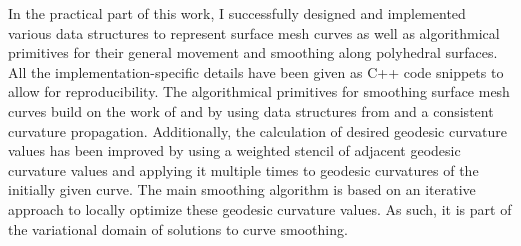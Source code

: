 \documentclass[crop=false]{stdlocal}
\begin{document}
  In the practical part of this work, I successfully designed and implemented various data structures to represent surface mesh curves as well as algorithmical primitives for their general movement and smoothing along polyhedral surfaces.
  All the implementation-specific details have been given as C++ code snippets to allow for reproducibility.
  The algorithmical primitives for smoothing surface mesh curves build on the work of \textcite{martinez2005} and \textcite{lawonn2014} by using data structures from \textcite{mancinelli2022} and a consistent curvature propagation.
  Additionally, the calculation of desired geodesic curvature values has been improved by using a weighted stencil of adjacent geodesic curvature values and applying it multiple times to geodesic curvatures of the initially given curve.
  The main smoothing algorithm is based on an iterative approach to locally optimize these geodesic curvature values.
  As such, it is part of the variational domain of solutions to curve smoothing.


\end{document}

